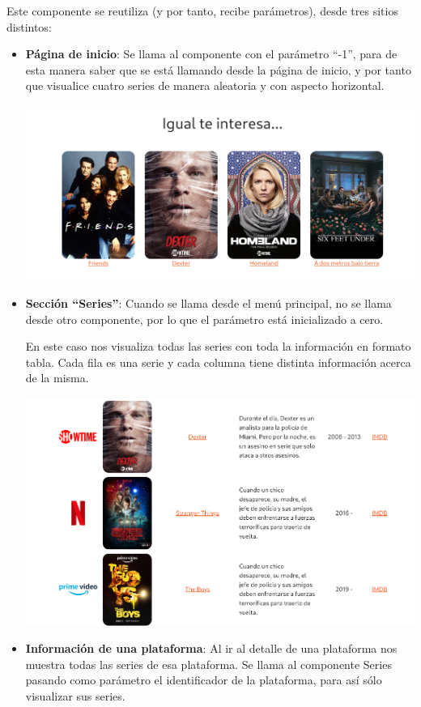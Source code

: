 \documentclass{\ClassPath/viu-tfm-template}
\begin{document}
Este componente se reutiliza (y por tanto, recibe parámetros), desde tres sitios distintos:
\begin{itemize}
    \item \textbf{Página de inicio}: Se llama al componente con el parámetro “-1”, para de esta manera saber que se está llamando desde la página de inicio, y por tanto que visualice cuatro series de manera aleatoria y con aspecto horizontal.
    \vspace{-0.2em}
    \begin{center}
        \includegraphics[frame,width=0.7\linewidth]{img/series-1.png}
    \end{center}

    \item \textbf{Sección “Series”}: Cuando se llama desde el menú principal, no se llama desde otro componente, por lo que el parámetro está inicializado a cero.

    En este caso nos visualiza todas las series con toda la información en formato tabla. Cada fila es una serie y cada columna tiene distinta información acerca de la misma.
    \vspace{-0.2em}
    \begin{center}
        \includegraphics[frame,width=0.7\linewidth]{img/series-2.png}
    \end{center}

    \item \textbf{Información de una plataforma}: Al ir al detalle de una plataforma nos muestra todas las series de esa plataforma. Se llama al componente Series pasando como parámetro el identificador de la plataforma, para así sólo visualizar sus series.


\end{itemize}
\end{document}
